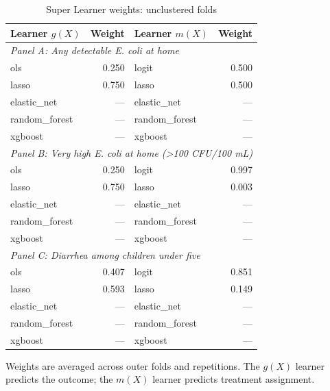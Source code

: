 \begin{table}[htbp]
\centering
\caption{Super Learner weights: unclustered folds}
\label{tab:super-learner-weights-unclustered}
\small
\begin{tabular}{lrlr}
\toprule
Learner $g(X)$ & Weight & Learner $m(X)$ & Weight \\
\midrule
\multicolumn{4}{l}{\textit{Panel A: Any detectable E. coli at home}} \\
ols & 0.250 & logit & 0.500 \\
lasso & 0.750 & lasso & 0.500 \\
elastic\_net & --- & elastic\_net & --- \\
random\_forest & --- & random\_forest & --- \\
xgboost & --- & xgboost & --- \\
\midrule
\multicolumn{4}{l}{\textit{Panel B: Very high E. coli at home (>100 CFU/100 mL)}} \\
ols & 0.250 & logit & 0.997 \\
lasso & 0.750 & lasso & 0.003 \\
elastic\_net & --- & elastic\_net & --- \\
random\_forest & --- & random\_forest & --- \\
xgboost & --- & xgboost & --- \\
\midrule
\multicolumn{4}{l}{\textit{Panel C: Diarrhea among children under five}} \\
ols & 0.407 & logit & 0.851 \\
lasso & 0.593 & lasso & 0.149 \\
elastic\_net & --- & elastic\_net & --- \\
random\_forest & --- & random\_forest & --- \\
xgboost & --- & xgboost & --- \\
\bottomrule
\end{tabular}
\par\vspace{3pt}
\begin{minipage}{0.9\linewidth}\footnotesize Weights are averaged across outer folds and repetitions. The $g(X)$ learner predicts the outcome; the $m(X)$ learner predicts treatment assignment.\end{minipage}
\end{table}